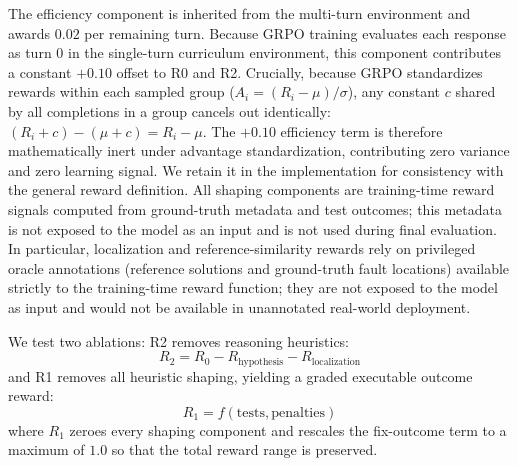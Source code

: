 \documentclass{article}
\begin{document}
The efficiency component is inherited from the multi-turn environment and awards $0.02$ per remaining turn. Because GRPO training evaluates each response as turn 0 in the single-turn curriculum environment, this component contributes a constant $+0.10$ offset to R0 and R2. Crucially, because GRPO standardizes rewards within each sampled group ($A_i = (R_i - \mu)/\sigma$), any constant $c$ shared by all completions in a group cancels out identically: $(R_i + c) - (\mu + c) = R_i - \mu$. The $+0.10$ efficiency term is therefore mathematically inert under advantage standardization, contributing zero variance and zero learning signal. We retain it in the implementation for consistency with the general reward definition. All shaping components are training-time reward signals computed from ground-truth metadata and test outcomes; this metadata is not exposed to the model as an input and is not used during final evaluation. In particular, localization and reference-similarity rewards rely on privileged oracle annotations (reference solutions and ground-truth fault locations) available strictly to the training-time reward function; they are not exposed to the model as input and would not be available in unannotated real-world deployment.

We test two ablations: R2 removes reasoning heuristics:
\begin{equation}
R_2 = R_0 - R_{\text{hypothesis}} - R_{\text{localization}}
\end{equation}
and R1 removes all heuristic shaping, yielding a graded executable outcome reward:
\begin{equation}
R_1 = f(\text{tests}, \text{penalties})
\end{equation}
where $R_1$ zeroes every shaping component and rescales the fix-outcome term to a maximum of $1.0$ so that the total reward range is preserved.
\end{document}
